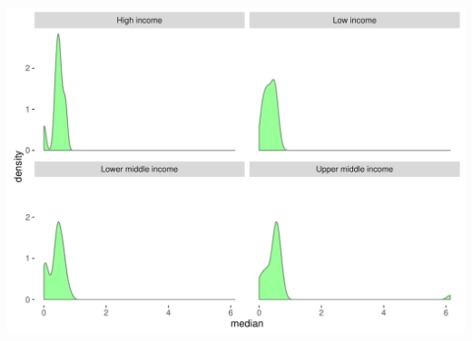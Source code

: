 \documentclass{article}\usepackage[]{graphicx}\usepackage[]{color}
\makeatletter
\def\maxwidth{ %
  \ifdim\Gin@nat@width>\linewidth
    \linewidth
  \else
    \Gin@nat@width
  \fi
}
\makeatother
\begin{document}
    \begin{minipage}[c]{0.99\textwidth}  
    


{\centering \includegraphics[width=\maxwidth]{figure/plot3-1} 

}



      \vspace*{0.5cm}
    \end{minipage}

\newpage
\end{document}
